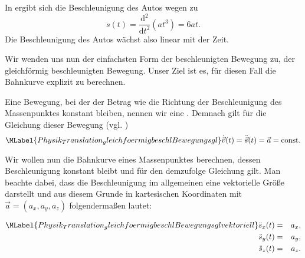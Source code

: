 \begin{MContent}
\begin{MExercise}
     \begin{MSolution}
     In  ergibt sich die Beschleunigung des Autos wegen  zu
     \begin{equation*}
     \ddot{s}(t)=\frac{\textrm{d}^2}{\textrm{d}t^2}\left(at^3\right)=6at.
     \end{equation*} Die Beschleunigung des Autos w\"achst also linear mit der Zeit.\\
    
     \end{MSolution}
     \end{MExercise}
     
     
     
     
     
     Wir wenden uns nun der einfachsten Form der beschleunigten Bewegung zu, der gleichf\"ormig beschleunigten Bewegung. Unser Ziel ist es, f\"ur diesen Fall die Bahnkurve explizit zu berechnen. 
       
     \begin{MInfo}
     Eine Bewegung, bei der der Betrag wie die Richtung der Beschleunigung des Massenpunktes konstant bleiben, nennen wir eine .  Demnach gilt f\"ur die Gleichung dieser Bewegung (vgl. )
     \begin{equation}
     \MLabel{Physik_Translation_ gleichfoermigbeschlBewegungsgl}
     \dot{\vec{v}}(t)=\ddot{\vec{s}}(t)=\vec{a}=\textrm{const}.
     \end{equation}
     \end{MInfo}
     
     Wir wollen nun die Bahnkurve eines Massenpunktes berechnen, dessen Beschleunigung konstant bleibt und f\"ur den demzufolge Gleichung  gilt. Man beachte dabei, dass die Beschleunigung im allgemeinen eine vektorielle Gr\"o{\ss}e darstellt und aus diesem Grunde   in kartesischen Koordinaten mit $\vec{a}=(a_x,a_y,a_z)$ folgenderma{\ss}en lautet:
     
     \begin{eqnarray}
     \MLabel{Physik_Translation_ gleichfoermigbeschlBewegungsglvektoriell}
      \nonumber\ddot{s}_x(t)&=&a_x,\\
      \ddot{s}_y(t)&=&a_y,\\
      \nonumber\ddot{s}_z(t)&=&a_z.
     \end{eqnarray}
     

\end{MContent}
